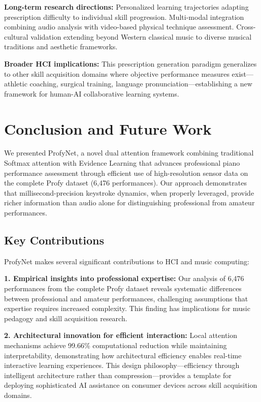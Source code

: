 \documentclass[sigconf,review,anonymous]{acmart}
\begin{document}
\textbf{Long-term research directions:} Personalized learning trajectories adapting prescription difficulty to individual skill progression. Multi-modal integration combining audio analysis with video-based physical technique assessment. Cross-cultural validation extending beyond Western classical music to diverse musical traditions and aesthetic frameworks.

\textbf{Broader HCI implications:} This prescription generation paradigm generalizes to other skill acquisition domains where objective performance measures exist—athletic coaching, surgical training, language pronunciation—establishing a new framework for human-AI collaborative learning systems.

\section{Conclusion and Future Work}

We presented ProfyNet, a novel dual attention framework combining traditional Softmax attention with Evidence Learning that advances professional piano performance assessment through efficient use of high-resolution sensor data on the complete Profy dataset (6,476 performances). Our approach demonstrates that millisecond-precision keystroke dynamics, when properly leveraged, provide richer information than audio alone for distinguishing professional from amateur performances.

\subsection{Key Contributions}

ProfyNet makes several significant contributions to HCI and music computing:

\textbf{1. Empirical insights into professional expertise:} Our analysis of 6,476 performances from the complete Profy dataset reveals systematic differences between professional and amateur performances, challenging assumptions that expertise requires increased complexity. This finding has implications for music pedagogy and skill acquisition research.

\textbf{2. Architectural innovation for efficient interaction:} Local attention mechanisms achieve 99.66\% computational reduction while maintaining interpretability, demonstrating how architectural efficiency enables real-time interactive learning experiences. This design philosophy—efficiency through intelligent architecture rather than compression—provides a template for deploying sophisticated AI assistance on consumer devices across skill acquisition domains.
\end{document}
